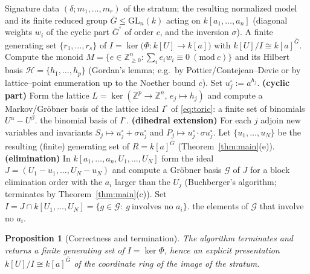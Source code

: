 \documentclass{amsart}
\newtheorem{proposition}[theorem]{Proposition}
\theoremstyle{definition}
\begin{document}
\begin{algorithm}[h]
\caption{Generators of the dihedral relation ideal $I$ on a stratum}
\begin{algorithmic}[1]
\Require Signature data $(\delta;m_1,\dots,m_r)$ of the stratum; the resulting
normalized model and its finite reduced group $\bar G\le\mathrm{GL}_n(k)$ acting on
$k[a_1,\dots,a_n]$ (diagonal weights $w_i$ of the cyclic part $\bar G^{\circ}$ of
order $c$, and the inversion $\sigma$).
\Ensure A finite generating set $\{r_1,\dots,r_s\}$ of $I=\ker\bigl(\Phi:k[U]\to
k[a]\bigr)$ with $k[U]/I\cong k[a]^{\bar G}$.
\State Compute the monoid $M=\{e\in\mathbb{Z}_{\ge0}^n:\sum_i e_iw_i\equiv0\
(\mathrm{mod}\ c)\}$ and its Hilbert basis $\mathcal H=\{h_1,\dots,h_p\}$
(Gordan's lemma; e.g.\ by Pottier/Contejean--Devie or by lattice--point
enumeration up to the Noether bound $c$). Set $u^{\circ}_j:=a^{h_j}$.
\State \textbf{(cyclic part)} Form the lattice
$L=\ker(\mathbb{Z}^p\to\mathbb{Z}^n,\,e_j\mapsto h_j)$ and compute a Markov/Gr\"obner
basis of the lattice ideal $I^{\circ}$ of \eqref{eq:toric}: a finite set of
binomials $U^{\alpha}-U^{\beta}$.
   \State \Return the binomial basis of $I^{\circ}$. 
\EndIf
\State \textbf{(dihedral extension)} For each $j$ adjoin new variables and invariants
$S_j\mapsto u^{\circ}_j+\sigma u^{\circ}_j$ and
$P_j\mapsto u^{\circ}_j\cdot\sigma u^{\circ}_j$.
Let $\{u_1,\dots,u_N\}$ be the resulting (finite) generating set of
$R=k[a]^{\bar G}$ (Theorem~\ref{thm:main}(e)).
\State \textbf{(elimination)} In $k[a_1,\dots,a_n,U_1,\dots,U_N]$ form the ideal
$J=(U_1-u_1,\dots,U_N-u_N)$ and compute a Gr\"obner basis $\mathcal G$ of $J$ for a
block elimination order with the $a_i$ larger than the $U_j$
(Buchberger's algorithm; terminates by Theorem~\ref{thm:main}(c)).
\State Set $I=J\cap k[U_1,\dots,U_N]=\{g\in\mathcal G:\ g\ \text{involves no }a_i\}$.
\State \Return the elements of $\mathcal G$ that involve no $a_i$.
\end{algorithmic}
\end{algorithm}

\begin{proposition}[Correctness and termination]\label{prop:algo}
The algorithm terminates and returns a finite generating set of $I=\ker\Phi$, hence
an explicit presentation $k[U]/I\cong k[a]^{\bar G}$ of the coordinate ring of the
image of the stratum.
\end{proposition}
\end{document}
